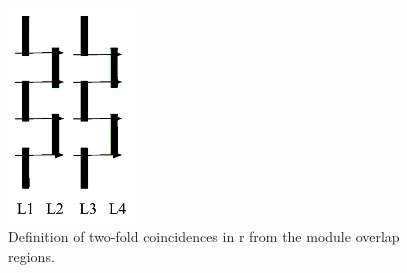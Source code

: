 \begin{figure}[!htp]
\centering
\includegraphics[width=0.3\textwidth]{ashish_thesis/twofoldinr_exam.png}
\caption[Examples of two fold coincidences in r]{%
  Definition of two-fold coincidences in r from the module overlap regions.
}
\label{fig:cluster_ring_72034}
\end{figure}


